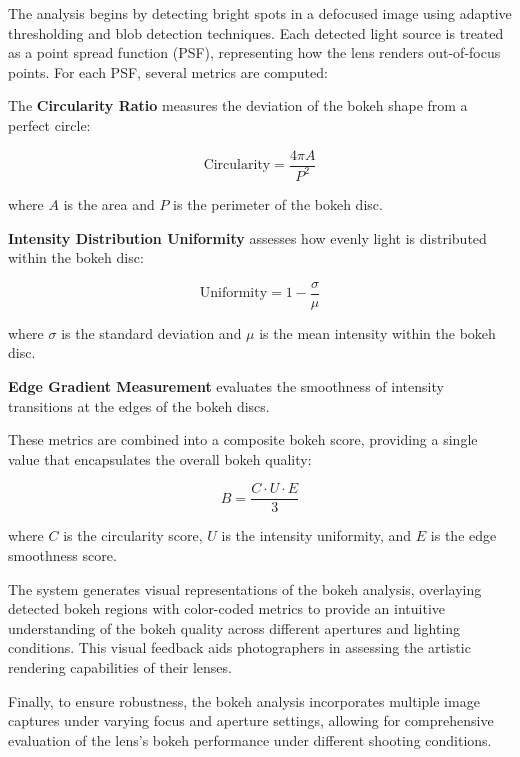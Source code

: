 The analysis begins by detecting bright spots in a defocused image using adaptive thresholding and blob detection techniques. Each detected light source is treated as a point spread function (PSF), representing how the lens renders out-of-focus points. For each PSF, several metrics are computed:

The \textbf{Circularity Ratio} measures the deviation of the bokeh shape from a perfect circle:

\begin{equation}
\text{Circularity} = \frac{4\pi A}{P^2}
\end{equation}

where \( A \) is the area and \( P \) is the perimeter of the bokeh disc.

\textbf{Intensity Distribution Uniformity} assesses how evenly light is distributed within the bokeh disc:

\begin{equation}
\text{Uniformity} = 1 - \frac{\sigma}{\mu}
\end{equation}

where \( \sigma \) is the standard deviation and \( \mu \) is the mean intensity within the bokeh disc.

\textbf{Edge Gradient Measurement} evaluates the smoothness of intensity transitions at the edges of the bokeh discs.

These metrics are combined into a composite bokeh score, providing a single value that encapsulates the overall bokeh quality:

\begin{equation}
B = \frac{C \cdot U \cdot E}{3}
\end{equation}

where \( C \) is the circularity score, \( U \) is the intensity uniformity, and \( E \) is the edge smoothness score.

The system generates visual representations of the bokeh analysis, overlaying detected bokeh regions with color-coded metrics to provide an intuitive understanding of the bokeh quality across different apertures and lighting conditions. This visual feedback aids photographers in assessing the artistic rendering capabilities of their lenses.

Finally, to ensure robustness, the bokeh analysis incorporates multiple image captures under varying focus and aperture settings, allowing for comprehensive evaluation of the lens's bokeh performance under different shooting conditions.

